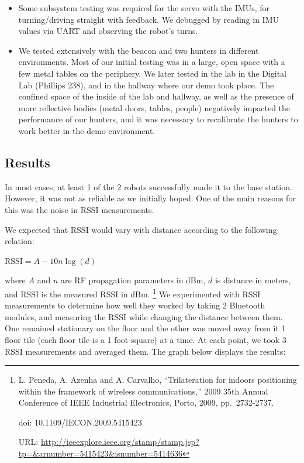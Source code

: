 \documentclass[]{article}
\providecommand{\tightlist}{%
  \setlength{\itemsep}{0pt}\setlength{\parskip}{0pt}}
\begin{document}
\begin{itemize}
\tightlist
\item
  Some subsystem testing was required for the servo with the IMUs, for
  turning/driving straight with feedback. We debugged by reading in IMU
  values via UART and observing the robot's turns.
\item
  We tested extensively with the beacon and two hunters in different
  environments. Most of our initial testing was in a large, open space
  with a few metal tables on the periphery. We later tested in the lab
  in the Digital Lab (Phillips 238), and in the hallway where our demo
  took place. The confined space of the inside of the lab and hallway,
  as well as the presence of more reflective bodies (metal doors,
  tables, people) negatively impacted the performance of our hunters,
  and it was necessary to recalibrate the hunters to work better in the
  demo environment.
\end{itemize}

\hypertarget{results}{%
\subsection{Results}\label{results}}

In most cases, at least 1 of the 2 robots successfully made it to the
base station. However, it was not as reliable as we initially hoped. One
of the main reasons for this was the noise in RSSI measurements.

We expected that RSSI would vary with distance according to the
following relation:

\(\text{RSSI} = A - 10 n \log(d)\)

where \(A\) and \(n\) are RF propagation parameters in dBm, \(d\) is
distance in meters, and RSSI is the measured RSSI in dBm. \footnote{L.
  Peneda, A. Azenha and A. Carvalho, ``Trilateration for indoors
  positioning within the framework of wireless communications,'' 2009
  35th Annual Conference of IEEE Industrial Electronics, Porto, 2009,
  pp.~2732-2737.

  doi: 10.1109/IECON.2009.5415423

  URL:
  \url{http://ieeexplore.ieee.org/stamp/stamp.jsp?tp=\&arnumber=5415423\&isnumber=5414636}}
We experimented with RSSI measurements to determine how well they worked
by taking 2 Bluetooth modules, and measuring the RSSI while changing the
distance between them. One remained stationary on the floor and the
other was moved away from it 1 floor tile (each floor tile is a 1 foot
square) at a time. At each point, we took 3 RSSI measurements and
averaged them. The graph below displays the results:
\end{document}
